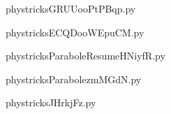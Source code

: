     

    \clearpage
    


    \newcommand{\CaptionFigGRUUooPtPBqp}{<+Type your caption here+>}
    \begin{center}
        
    \end{center}
    phystricksGRUUooPtPBqp.py

    

    \clearpage
    


    \newcommand{\CaptionFigECQDooWEpuCM}{<+Type your caption here+>}
    \begin{center}
        
    \end{center}
    phystricksECQDooWEpuCM.py

    

    \clearpage
    


    \newcommand{\CaptionFigParaboleResumeHNiyfR}{<+Type your caption here+>}
    \begin{center}
        
    \end{center}
    phystricksParaboleResumeHNiyfR.py

    

    \clearpage
    


    \newcommand{\CaptionFigParabolezmMGdN}{<+Type your caption here+>}
    \begin{center}
        
    \end{center}
    phystricksParabolezmMGdN.py

    

    \clearpage
    


    \newcommand{\CaptionFigJHrkjFz}{<+Type your caption here+>}
    \begin{center}
        
    \end{center}
    phystricksJHrkjFz.py

    

    \clearpage
    

